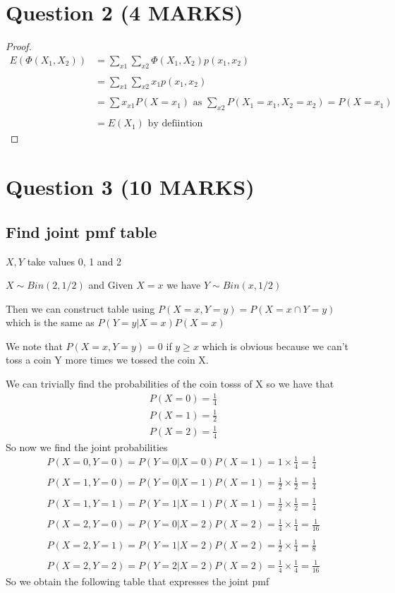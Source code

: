 \documentclass[11pt]{article}
\begin{document}
\section{Question 2 (4 MARKS)}
\begin{proof}
\begin{align*}
  E(\Phi(X_{1},X_{2})) &= \sum_{x1} \sum_{x2} \Phi(X_{1},X_{2}) p(x_{1},x_{2}) \\ \\
  &= \sum_{x1} \sum_{x2} x_{1} p(x_{1},x_{2}) \\ \\
  &= \sum{x_{x1}}P(X=x_{1}) \text{  as  $\sum_{x2}P(X_{1}=x_{1},X_{2}=x_{2}) = P(X=x_{1})$} \\ \\
  &= E(X_{1}) \text{ by defiintion}
\end{align*}
\end{proof}
\section{Question 3 (10 MARKS)}
\subsection{Find joint pmf table}
$X,Y$ take values 0, 1 and 2

$X \sim Bin(2,1/2)$ and Given $X=x$ we have $Y \sim Bin(x,1/2)$

Then we can construct table using $P(X=x,Y=y) = P(X=x \cap Y=y)$ which is the same as $P(Y=y | X=x) P(X=x)$

We note that $P(X=x,Y=y)=0$ if $y\geq x$ which is obvious because we can't toss a coin Y more times we tossed the coin X.

We can trivially find the probabilities of the coin tosss of X so we have that
\begin{align*}
  P(X=0)=\frac{1}{4}\\
  P(X=1)=\frac{1}{2} \\
  P(X=2)=\frac{1}{4}
\end{align*}
So now we find the joint probabilities
\begin{align*}
  P(X=0,Y=0) = P(Y=0|X=0)P(X=1) = 1 \times \frac{1}{4} = \frac{1}{4} \\ \\
  P(X=1,Y=0) = P(Y=0|X=1)P(X=1) = \frac{1}{2} \times \frac{1}{2} = \frac{1}{4} \\ \\
  P(X=1,Y=1) = P(Y=1|X=1)P(X=1) = \frac{1}{2} \times \frac{1}{2} = \frac{1}{4} \\ \\
  P(X=2,Y=0) = P(Y=0|X=2)P(X=2) = \frac{1}{4} \times \frac{1}{4} = \frac{1}{16} \\ \\
  P(X=2,Y=1) = P(Y=1|X=2)P(X=2) = \frac{1}{2} \times \frac{1}{4} = \frac{1}{8} \\ \\
  P(X=2,Y=2) = P(Y=2|X=2)P(X=2) = \frac{1}{4} \times \frac{1}{4} = \frac{1}{16}
\end{align*}
So we obtain the following table that expresses the joint pmf
\end{document}
